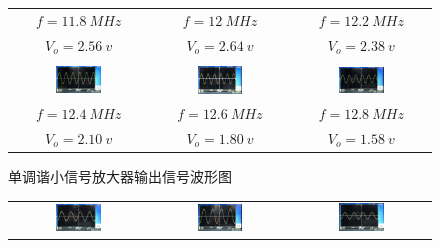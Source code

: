 \documentclass[12pt]{article}%
\numberwithin{equation}{section}
\begin{document}
\begin{enumerate}
\begin{figure}[htbp]
\begin{tabular}{ccc}
$f=11.8\ MHz$ & $f=12\ MHz$ & $f=12.2\ MHz$ \\
$V_o=2.56\ v$ & $V_o=2.64\ v$ & $V_o=2.38\ v$ \\
\\
 \includegraphics[width=0.35\textwidth]{gaopin2/gaopin214.jpg} &\includegraphics[width=0.35\textwidth]{gaopin2/gaopin217.jpg}&\includegraphics[width=0.35\textwidth]{gaopin2/gaopin219.jpg} \\ 
$f=12.4\ MHz$ & $f=12.6\ MHz$ & $f=12.8\ MHz$ \\
$V_o=2.10\ v$ & $V_o=1.80\ v$ & $V_o=1.58\ v$ \\
\end{tabular}
\caption{单调谐小信号放大器输出信号波形图}\label{img:121}
\end{figure}
\begin{figure}[htbp]
\centering
\begin{tabular}{ccc}
 \includegraphics[width=0.35\textwidth]{gaopin2/gaopin202.jpg} &\includegraphics[width=0.35\textwidth]{gaopin2/gaopin222.jpg}&\includegraphics[width=0.35\textwidth]{gaopin2/gaopin204.jpg} \\ 

\end{tabular}
\end{figure}
\end{enumerate}
\end{document}
